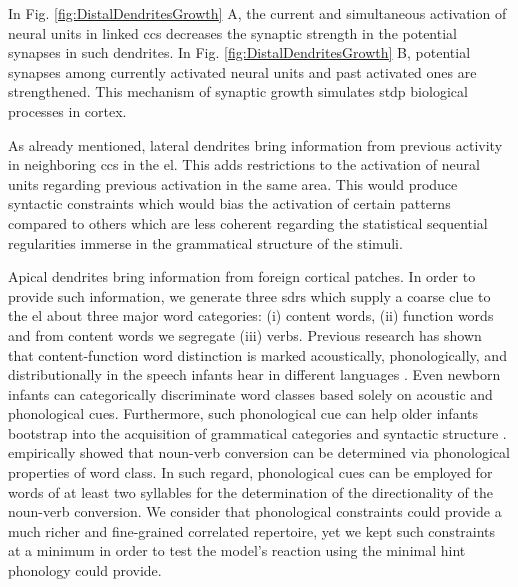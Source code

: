 { In Fig. \ref{fig:DistalDendritesGrowth} A, the current and simultaneous activation of neural units in linked \glspl{cc} decreases the synaptic strength in the potential synapses in such dendrites. In Fig. \ref{fig:DistalDendritesGrowth} B, potential synapses among currently activated neural units and past activated ones are strengthened. This mechanism of synaptic growth simulates \gls{stdp} biological processes in cortex.
 
 As already mentioned, lateral dendrites bring information from previous activity in neighboring \glspl{cc} in the \gls{el}. This adds restrictions to the activation of neural units regarding previous activation in the same area. This would produce syntactic constraints which would bias the activation of certain patterns compared to others which are less coherent regarding the statistical sequential regularities immerse in the grammatical structure of the stimuli.

Apical dendrites bring information from foreign cortical patches.
In order to provide such information, we generate three \glspl{sdr} which supply a coarse clue to the \gls{el} about three major word categories: (i) content words, (ii) function words and from content words we segregate (iii) verbs.
Previous research has shown that content-function word distinction is marked acoustically, phonologically, and distributionally in the speech infants hear in different languages \cite{Shi1995PerceptualCO,shi_morgan_allopenna_1998}.
Even newborn infants can categorically discriminate word classes based solely on acoustic and phonological cues.
Furthermore, such phonological cue can help older infants bootstrap into the acquisition of grammatical categories and syntactic structure \cite{shi_newborn_1999}.
\cite{lohmann_phonological_2017} empirically showed that noun-verb conversion can be determined via phonological properties of word class. In such regard, phonological cues can be employed for words of at least two syllables for the determination of the directionality of the noun-verb conversion.
We consider that phonological constraints could provide a much richer and fine-grained correlated repertoire, yet we kept such constraints at a minimum in order to test the model's reaction using the minimal hint phonology could provide.
}













